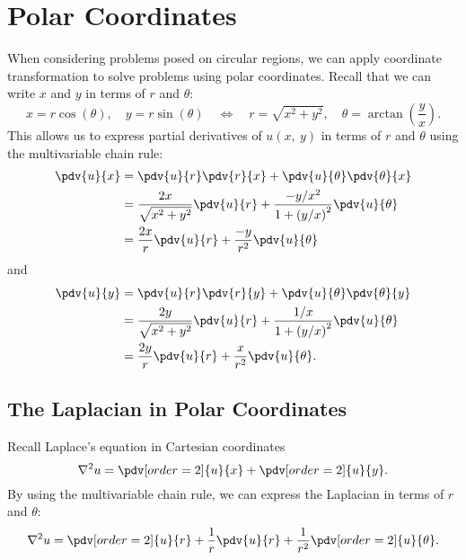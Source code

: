 \documentclass{article}
\begin{document}
\section{Polar Coordinates}
When considering problems posed on circular regions, we can apply
coordinate transformation to solve problems using polar coordinates.
Recall that we can write \(x\) and \(y\) in terms of \(r\) and
\(\theta\):
\begin{equation*}
    x = r \cos{\left( \theta \right)}, \quad y = r \sin{\left( \theta \right)} \quad \iff \quad r = \sqrt{x^2 + y^2}, \quad \theta = \arctan{\left( \frac{y}{x} \right)}.
\end{equation*}
This allows us to express partial derivatives of \(u\left( x, \: y \right)\) in terms of \(r\) and \(\theta\) using the multivariable chain rule:
\begin{align*}
    \pdv{u}{x} & = \pdv{u}{r} \pdv{r}{x} + \pdv{u}{\theta} \pdv{\theta}{x}                                        \\
               & = \frac{2x}{\sqrt{x^2 + y^2}} \pdv{u}{r} + \frac{-y/x^2}{1+\left( y/x \right)^2} \pdv{u}{\theta} \\
               & = \frac{2x}{r} \pdv{u}{r} + \frac{-y}{r^2} \pdv{u}{\theta}
\end{align*}
and
\begin{align*}
    \pdv{u}{y} & = \pdv{u}{r} \pdv{r}{y} + \pdv{u}{\theta} \pdv{\theta}{y}                                     \\
               & = \frac{2y}{\sqrt{x^2 + y^2}} \pdv{u}{r} + \frac{1/x}{1+\left( y/x \right)^2} \pdv{u}{\theta} \\
               & = \frac{2y}{r} \pdv{u}{r} + \frac{x}{r^2} \pdv{u}{\theta}.
\end{align*}
\subsection{The Laplacian in Polar Coordinates}
Recall Laplace's equation in Cartesian coordinates
\begin{equation*}
    \nabla^2 u = \pdv[order=2]{u}{x} + \pdv[order=2]{u}{y}.
\end{equation*}
By using the multivariable chain rule, we can express the Laplacian in terms of \(r\) and \(\theta\):
\begin{equation*}
    \nabla^2 u = \pdv[order=2]{u}{r} + \frac{1}{r} \pdv{u}{r} + \frac{1}{r^2} \pdv[order=2]{u}{\theta}.
\end{equation*}
\end{document}
